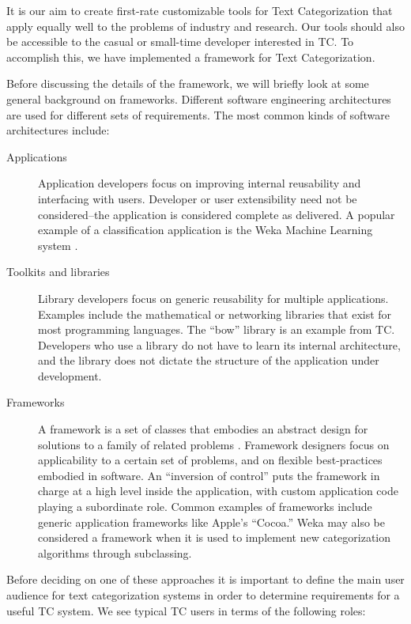\documentclass[a4paper,twocolumn]{article}
\begin{document}
It is our aim to create first-rate customizable tools for Text
Categorization that apply equally well to the problems of industry and
research.  Our tools should also be accessible to the casual or
small-time developer interested in TC.  To accomplish this, we have
implemented a framework for Text Categorization.

Before discussing the details of the framework, we will briefly look at some general
background on frameworks.  Different software engineering
architectures are used for different sets of requirements.  The most
common kinds of software architectures include:


\begin{description}
\item[Applications] Application developers focus on improving internal
reusability and interfacing with users.  Developer or user
extensibility need not be considered--the application is considered
complete as delivered.  A popular example of a classification
application is the Weka Machine Learning system \cite{weka:99}.

\item[Toolkits and libraries] Library developers focus on generic
reusability for multiple applications.  Examples include the
mathematical or networking libraries that exist for most programming
languages.  The ``bow'' library \cite{bow:96} is an example from TC.
Developers who use a library do not have to learn its internal
architecture, and the library does not dictate the structure of the
application under development.  \cite{fayad:99}

\item[Frameworks] A framework is a set of classes that embodies an
abstract design for solutions to a family of related problems
\cite[Ch. 2]{fayad:99}.  Framework designers focus on applicability to
a certain set of problems, and on flexible best-practices embodied in
software.  An ``inversion of control'' puts the framework in charge at
a high level inside the application, with custom application code
playing a subordinate role.  Common examples of frameworks include
generic application frameworks like Apple's ``Cocoa.''  Weka may also
be considered a framework when it is used to implement new
categorization algorithms through subclassing.
\end{description}


Before deciding on one of these approaches it is important to define
the main user audience for text categorization systems in order to determine
 requirements for a useful TC system.  We see typical TC users in terms of the following
roles:
\end{document}
